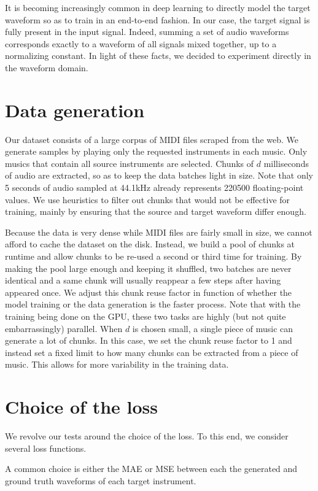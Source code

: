 \documentclass[twocolumn,superscriptaddress,aps]{revtex4-1}
\begin{document}
It is becoming increasingly common in deep learning to directly model the target waveform so as to train in an end-to-end fashion. In our case, the target signal is fully present in the input signal. Indeed, summing a set of audio waveforms corresponds exactly to a waveform of all signals mixed together, up to a normalizing constant. In light of these facts, we decided to experiment directly in the waveform domain.

\section{Data generation}
Our dataset consists of a large corpus of MIDI files scraped from the web. We generate samples by playing only the requested instruments in each music. Only musics that contain all source instruments are selected. Chunks of $d$ milliseconds of audio are extracted, so as to keep the data batches light in size. Note that only 5 seconds of audio sampled at 44.1kHz already represents 220500 floating-point values. We use heuristics to filter out chunks that would not be effective for training, mainly by ensuring that the source and target waveform differ enough.

Because the data is very dense while MIDI files are fairly small in size, we cannot afford to cache the dataset on the disk. Instead, we build a pool of chunks at runtime and allow chunks to be re-used a second or third time for training. By making the pool large enough and keeping it shuffled, two batches are never identical and a same chunk will usually reappear a few steps after having appeared once. We adjust this chunk reuse factor in function of whether the model training or the data generation is the faster process. Note that with the training being done on the GPU, these two tasks are highly (but not quite embarrassingly) parallel. When $d$ is chosen small, a single piece of music can generate a lot of chunks. In this case, we set the chunk reuse factor to 1 and instead set a fixed limit to how many chunks can be extracted from a piece of music. This allows for more variability in the training data.

\section{Choice of the loss}
We revolve our tests around the choice of the loss. To this end, we consider several loss functions.

A common choice is either the MAE or MSE between each the generated and ground truth waveforms of each target instrument.
\end{document}
